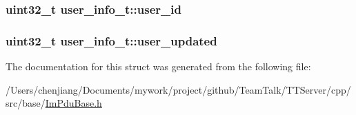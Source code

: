 \subsubsection[{user\+\_\+id}]{\setlength{\rightskip}{0pt plus 5cm}uint32\+\_\+t user\+\_\+info\+\_\+t\+::user\+\_\+id}\label{structuser__info__t_ae3a04b7cdef9403c5ad87d77ed17215c}
\hypertarget{structuser__info__t_a48b23d894d4aa082670564dc7231aaeb}{}
\subsubsection[{user\+\_\+updated}]{\setlength{\rightskip}{0pt plus 5cm}uint32\+\_\+t user\+\_\+info\+\_\+t\+::user\+\_\+updated}\label{structuser__info__t_a48b23d894d4aa082670564dc7231aaeb}


The documentation for this struct was generated from the following file\+:\begin{DoxyCompactItemize}
\item 
/\+Users/chenjiang/\+Documents/mywork/project/github/\+Team\+Talk/\+T\+T\+Server/cpp/src/base/\hyperlink{_im_pdu_base_8h}{Im\+Pdu\+Base.\+h}\end{DoxyCompactItemize}
